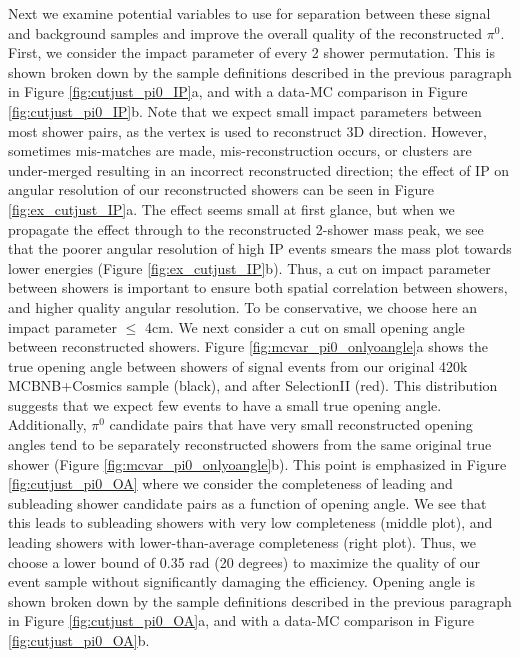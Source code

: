 \documentclass{article}
\begin{document}
Next we examine potential variables to use for separation between these signal and background samples  and improve the overall quality of the reconstructed $\pi^{0}$.  First, we consider the impact parameter of every 2 shower permutation.  This is shown broken down by the sample definitions described in the previous paragraph in Figure \ref{fig:cutjust_pi0_IP}a, and with a data-MC comparison in Figure \ref{fig:cutjust_pi0_IP}b.  Note that we expect small impact parameters between most shower pairs, as the vertex is used to reconstruct 3D direction. However, sometimes mis-matches are made, mis-reconstruction occurs, or clusters are under-merged resulting in an incorrect reconstructed direction; the effect of IP on angular resolution of our reconstructed showers can be seen in Figure \ref{fig:ex_cutjust_IP}a. The effect seems small at first glance, but when we propagate the effect through to the reconstructed 2-shower mass peak, we see that the poorer angular resolution of high IP events smears the mass plot towards lower energies (Figure \ref{fig:ex_cutjust_IP}b). Thus, a cut on impact parameter between showers is important to ensure both spatial correlation between showers, and higher quality angular resolution.  To be conservative, we choose here an impact parameter $\leq$ 4cm.  
We next consider a cut on small opening angle between reconstructed showers. Figure \ref{fig:mcvar_pi0_onlyoangle}a shows the true opening angle between showers of signal events from our original 420k MCBNB+Cosmics sample (black), and after SelectionII (red). This distribution suggests that we expect few events to have a small true opening angle. Additionally, $\pi^0$ candidate pairs that have very small reconstructed opening angles tend to be separately reconstructed showers from the same original true shower (Figure \ref{fig:mcvar_pi0_onlyoangle}b). This point is emphasized in Figure \ref{fig:cutjust_pi0_OA} where we consider the completeness of leading and subleading shower candidate pairs as a function of opening angle. We see that this leads to subleading showers with very low completeness (middle plot), and leading showers with lower-than-average completeness (right plot). Thus, we choose a lower bound of 0.35 rad (20 degrees) to maximize the quality of our event sample without significantly damaging the efficiency. Opening angle is shown broken down by the sample definitions described in the previous paragraph in Figure \ref{fig:cutjust_pi0_OA}a, and with a data-MC comparison in Figure \ref{fig:cutjust_pi0_OA}b. %
\end{document}
